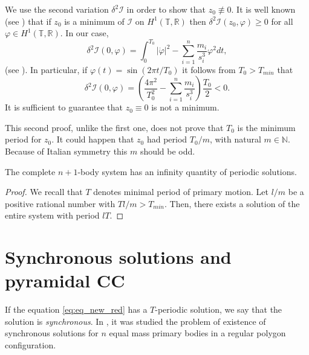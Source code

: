\documentclass[smallcondensed]{svjour3}
\newcommand{\rr}{\mathbb{R}}
\begin{document}
\begin{remark}
We use the second variation $\delta^2 \mathcal{I}$ in order to show  that $z_0\nequiv 0$. It is well known (see \cite[Th. 1.3.1]{jost1998calculus}) that if $z_0$ is a minimum of $\mathcal{I}$ on $H^1(\mathbb{T},\rr)$  then $\delta^2 \mathcal{I} (z_0,\varphi)\geq 0$ for all $\varphi\in H^1(\mathbb{T},\rr)$. In our case,
\[\delta^2\mathcal{I}(0,\varphi)=\int_0^{T_0} |\dot{\varphi}|^2-\sum_{i=1}^{n}\frac{m_i}{s_i^3}\varphi^2 dt,\]
(see \cite[Eq. 1.3.6]{jost1998calculus}). In particular, if $\varphi(t)=\sin (2\pi t/T_0)$ it follows from $T_0>T_{min}$  that
\begin{equation}\label{eq:form.delta2}
 \delta^2 \mathcal{I} (0,\varphi)=\left( \frac{4\pi^2}{T_0^2}-\sum_{i=1}^{n}\frac{m_i}{s_i^3} \right)\frac{T_0}{2}<0.
\end{equation}
It is sufficient  to guarantee that $z_0\equiv 0$ is not a minimum.


This second proof, unlike the first one, does not prove that $T_0$ is the minimum period for $z_0$. It could happen that $z_0$ had period $T_0/m$, with natural $m\in\mathbb{N}$. Because of Italian symmetry this $m$ should be odd.
\end{remark}






\begin{corollary}\label{cor:sol.periodica.sist.completo}
The complete $n+1$-body system has an infinity quantity of periodic solutions.
\end{corollary}
\begin{proof} We recall that $T$ denotes minimal period of primary motion.
Let $l/m$  be a positive rational number with $Tl/m>T_{min}$. Then, there exists a solution of the entire system with period $lT$.
\end{proof}





\section{Synchronous solutions and pyramidal CC}\label{sec:sincro}



If the equation \eqref{eq:eq_new_red} has a $T$-periodic solution,  we say that the solution is \emph{synchronous}. In \cite{li2013characterization}, it was studied the problem of existence of synchronous solutions for $n$ equal mass primary bodies in a regular polygon configuration.
\end{document}
